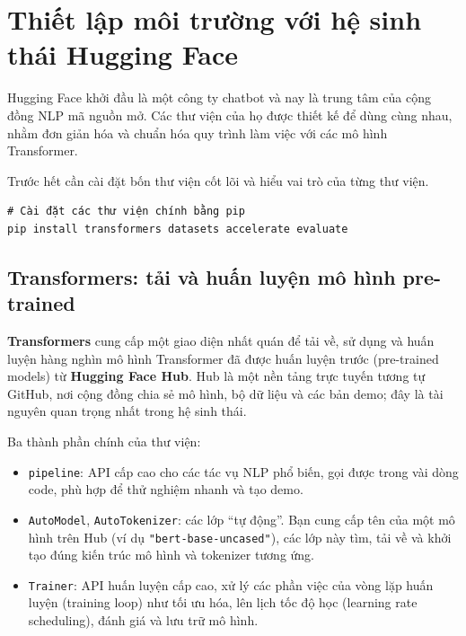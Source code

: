 
\section{Thiết lập môi trường với hệ sinh thái Hugging Face}
\label{sec:hf_ecosystem}

\begin{center}
\label{fig:hf_ecosystem_logos}
\end{center}

Hugging Face khởi đầu là một công ty chatbot và nay là trung tâm của cộng đồng NLP mã nguồn mở. Các thư viện của họ được thiết kế để dùng cùng nhau, nhằm đơn giản hóa và chuẩn hóa quy trình làm việc với các mô hình Transformer.

Trước hết cần cài đặt bốn thư viện cốt lõi và hiểu vai trò của từng thư viện.

\begin{verbatim}
# Cài đặt các thư viện chính bằng pip
pip install transformers datasets accelerate evaluate
\end{verbatim}

\subsection{Transformers: tải và huấn luyện mô hình pre-trained}
\label{ssec:hf_transformers}
\textbf{Transformers} cung cấp một giao diện nhất quán để tải về, sử dụng và huấn luyện hàng nghìn mô hình Transformer đã được huấn luyện trước (pre-trained models) từ \textbf{Hugging Face Hub}. Hub là một nền tảng trực tuyến tương tự GitHub, nơi cộng đồng chia sẻ mô hình, bộ dữ liệu và các bản demo; đây là tài nguyên quan trọng nhất trong hệ sinh thái.

Ba thành phần chính của thư viện:
\begin{itemize}
    \item \texttt{pipeline}: API cấp cao cho các tác vụ NLP phổ biến, gọi được trong vài dòng code, phù hợp để thử nghiệm nhanh và tạo demo.
    \item \texttt{AutoModel}, \texttt{AutoTokenizer}: các lớp “tự động”. Bạn cung cấp tên của một mô hình trên Hub (ví dụ \texttt{"bert-base-uncased"}), các lớp này tìm, tải về và khởi tạo đúng kiến trúc mô hình và tokenizer tương ứng.
    \item \texttt{Trainer}: API huấn luyện cấp cao, xử lý các phần việc của vòng lặp huấn luyện (training loop) như tối ưu hóa, lên lịch tốc độ học (learning rate scheduling), đánh giá và lưu trữ mô hình.
\end{itemize}

